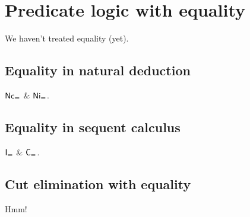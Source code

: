 %
\chapter{Predicate logic with equality}
\label{c-equality}
%
We haven't treated equality (yet).

\section{Equality in natural deduction}

\( \mathsf{Nc_=} \) \& \( \mathsf{Ni_=} \).

\section{Equality in sequent calculus}

\( \mathsf{I}_= \) \& \( \mathsf{C}_= \).

\section{Cut elimination with equality}

Hmm!